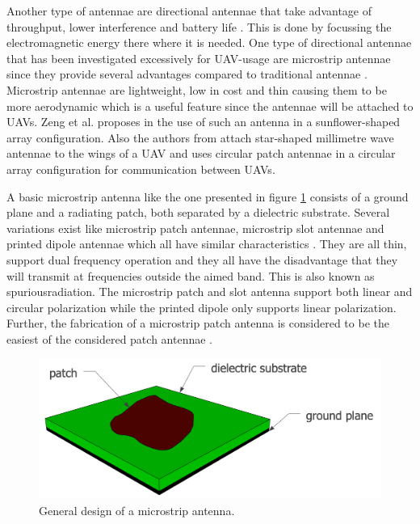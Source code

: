 Another type of antennae are directional antennae that take advantage of throughput, lower interference and battery life \cite{A7}. This is done by focussing the 
electromagnetic energy there where it is needed.
One type of directional antennae that has been investigated excessively for \gls{UAV}-usage are microstrip antennae
since they provide several advantages compared to traditional antennae \cite{J13_microstripadvantages, J14_antennadesign}. Microstrip antennae
are lightweight, low in cost and thin causing them to be more aerodynamic which is a useful feature since the antennae will be attached
to \gls{UAV}s.
Zeng et al. proposes in \cite{A6} the use of such an antenna in a sunflower-shaped array configuration.
Also the authors from \cite{A5} attach star-shaped millimetre wave antennae to the wings of a \gls{UAV} and
\cite{A8} uses circular patch antennae in a circular array configuration for communication between \gls{UAV}s.

A basic microstrip antenna like the one presented in figure \ref{fig:basicpatchantenna} consists of a ground plane and
a radiating patch, both separated by a dielectric substrate. 
Several variations exist like microstrip patch antennae, microstrip slot antennae and printed dipole antennae which
all have similar characteristics \cite{J13_microstripadvantages, J14_antennadesign}. They are all thin, support dual frequency operation and they all have the disadvantage that they 
will transmit at frequencies outside the aimed band. This is also known as
\gls{spuriousradiation}. The microstrip patch and slot antenna support both linear
and circular polarization while the printed dipole only supports linear polarization. 
Further, the fabrication of a microstrip patch antenna is considered to be 
the easiest of the considered patch antennae \cite{J13_microstripadvantages}. 

\begin{figure}[H]
\centering
  \includegraphics[width=\textwidth/2]{../images/patchantenna.png}
  \caption{General design of a microstrip antenna.}
  \label{fig:basicpatchantenna}
\end{figure}

